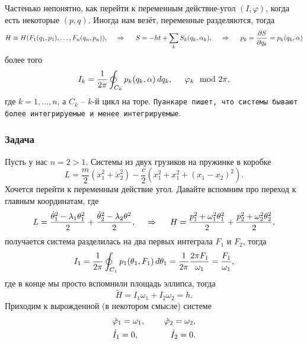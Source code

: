 Частенько непонятно, как перейти к переменным действие-угол $(I, \varphi)$, когда есть некоторые $(p, q)$. Иногда нам везёт, переменные разделяются, тогда
\begin{equation*}
    H \equiv H(F_1(q_1, p_1), \ldots, F_n(q_n, p_n)),
    \hspace{0.5cm} \Rightarrow \hspace{0.5cm}
    S = - h t + \sum_{k} S_k (q_k, \alpha_k),
    \hspace{0.5cm} \Rightarrow \hspace{0.5cm}
    p_k = \frac{\partial S}{\partial q_k} = p_k (q_k, \alpha)
\end{equation*}
более того
\begin{equation*}
    I_k = \frac{1}{2\pi} \oint_{C_k} p_k (q_k, \alpha) \, d q_k,
    \hspace{5 mm}
    \varphi_k \mod 2 \pi,
\end{equation*}
где $k = 1, \ldots, n$, а $C_k$ -- $k$-й цикл на торе. 
\texttt{Пуанкаре пишет, что системы бывают более интегрируемые и менее интегрируемые}.

\subsubsection*{Задача}

Пусть у нас $n=2>1$. Системы из двух грузиков на пружинке в коробке
\begin{equation*}
    L = \frac{m}{2} (\dot{x}_1^2 + \dot{x}_2^2) - \frac{c}{2} (x_1^2 + x_1^2 + (x_1-x_2)^2).
\end{equation*}
Хочется перейти к переменным действие угол. Давайте вспомним про переход к главным координатам, где
\begin{equation*}
    L = \frac{\dot{\theta}_1^2 - \lambda_1 \theta_1^2}{2} + \frac{\dot{\theta}_2^2 - \lambda_2 \theta^2}{2},
    \hspace{0.5cm} \Rightarrow \hspace{0.5cm}
    H = \frac{p_1^2 + \omega_1^2 \theta_1^2}{2} + \frac{p_2^2 + \omega_2^2 \theta_2^2}{2},
\end{equation*}
получается система разделилась на два первых интеграла $F_1$ и $F_2$, тогда
\begin{equation*}
    I_1  =\frac{1}{2\pi} \oint_{C_1} p_1 (\theta_1, F_1) \, d \theta_1 = \frac{1}{2\pi} \frac{2 \pi F_1}{\omega_1} = \frac{F_1}{\omega_1},
\end{equation*}
где в конце мы просто вспомнили площадь эллипса, тогда
\begin{equation*}
    \tilde{H} = I_1 \omega_1 + I_2 \omega_2 = h.
\end{equation*}
Приходим к вырожденной (в некотором смысле) системе
\begin{align*}
    &\dot{\varphi}_1 = \omega_1, \hspace{5 mm} &\dot{\varphi}_2 = \omega_2, \\
    &\dot{I}_1 = 0, \hspace{5 mm}   &\dot{I}_2 = 0.
\end{align*}


